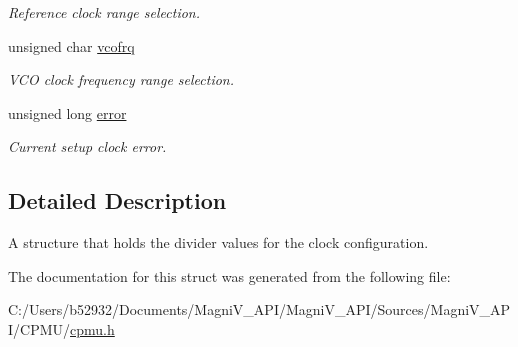 \begin{DoxyCompactItemize}
\begin{DoxyCompactList}\small\item\em Reference clock range selection. \end{DoxyCompactList}\item 
\hypertarget{structclock__dividers_a43a20a81435bbc4e8e331e54ba6cb1cd}{}unsigned char \hyperlink{structclock__dividers_a43a20a81435bbc4e8e331e54ba6cb1cd}{vcofrq}\label{structclock__dividers_a43a20a81435bbc4e8e331e54ba6cb1cd}

\begin{DoxyCompactList}\small\item\em V\+C\+O clock frequency range selection. \end{DoxyCompactList}\item 
\hypertarget{structclock__dividers_a39faec1f329a576e1825641bfa7eaa4c}{}unsigned long \hyperlink{structclock__dividers_a39faec1f329a576e1825641bfa7eaa4c}{error}\label{structclock__dividers_a39faec1f329a576e1825641bfa7eaa4c}

\begin{DoxyCompactList}\small\item\em Current setup clock error. \end{DoxyCompactList}\end{DoxyCompactItemize}


\subsection{Detailed Description}
A structure that holds the divider values for the clock configuration. 

The documentation for this struct was generated from the following file\+:\begin{DoxyCompactItemize}
\item 
C\+:/\+Users/b52932/\+Documents/\+Magni\+V\+\_\+\+A\+P\+I/\+Magni\+V\+\_\+\+A\+P\+I/\+Sources/\+Magni\+V\+\_\+\+A\+P\+I/\+C\+P\+M\+U/\hyperlink{cpmu_8h}{cpmu.\+h}\end{DoxyCompactItemize}
